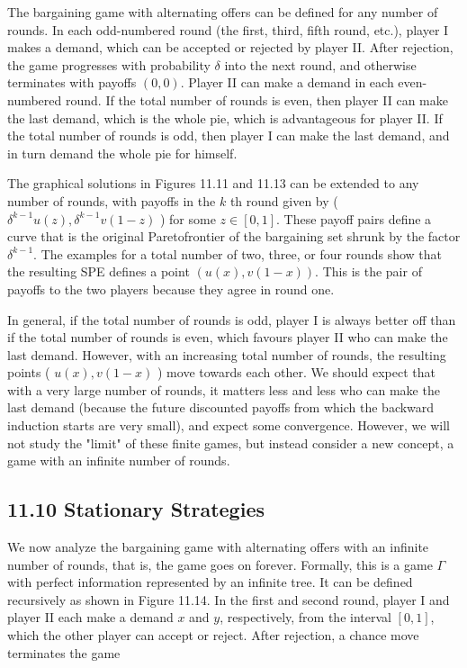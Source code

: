 \documentclass[12pt]{article}
\begin{document}
The bargaining game with alternating offers can be defined for any number of rounds. In each odd-numbered round (the first, third, fifth round, etc.), player I makes a demand, which can be accepted or rejected by player II. After rejection, the game progresses with probability $\delta$ into the next round, and otherwise terminates with payoffs $(0,0)$. Player II can make a demand in each even-numbered round. If the total number of rounds is even, then player II can make the last demand, which is the whole pie, which is advantageous for player II. If the total number of rounds is odd, then player I can make the last demand, and in turn demand the whole pie for himself.

The graphical solutions in Figures 11.11 and 11.13 can be extended to any number of rounds, with payoffs in the $k$ th round given by ( $\delta^{k-1} u(z), \delta^{k-1} v(1-z)$ ) for some $z \in[0,1]$. These payoff pairs define a curve that is the original Paretofrontier of the bargaining set shrunk by the factor $\delta^{k-1}$. The examples for a total number of two, three, or four rounds show that the resulting SPE defines a point $(u(x), v(1-x))$. This is the pair of payoffs to the two players because they agree in round one.

In general, if the total number of rounds is odd, player I is always better off than if the total number of rounds is even, which favours player II who can make the last demand. However, with an increasing total number of rounds, the resulting points ( $u(x), v(1-x)$ ) move towards each other. We should expect that with a very large number of rounds, it matters less and less who can make the last demand (because the future discounted payoffs from which the backward induction starts are very small), and expect some convergence. However, we will not study the "limit" of these finite games, but instead consider a new concept, a game with an infinite number of rounds.

\subsection*{11.10 Stationary Strategies}
We now analyze the bargaining game with alternating offers with an infinite number of rounds, that is, the game goes on forever. Formally, this is a game $\Gamma$ with perfect information represented by an infinite tree. It can be defined recursively as shown in Figure 11.14. In the first and second round, player I and player II each make a demand $x$ and $y$, respectively, from the interval $[0,1]$, which the other player can accept or reject. After rejection, a chance move terminates the game
\end{document}
